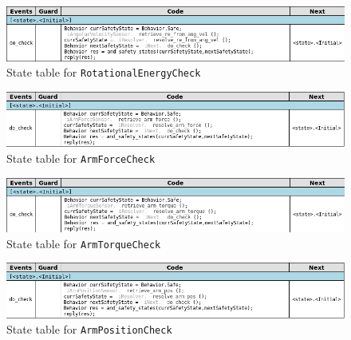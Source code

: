 \documentclass[12pt]{scrreprt}
\begin{document}
\begin{appendices}
\begin{figure}[H]
    \centering
    \includegraphics[width=\textwidth]{Figures/results/modelling_figures/RotationalEnergyCheck/RotationalEnergyCheck_state_table.png}
    \caption{State table for \texttt{RotationalEnergyCheck}}
    \label{fig:RotationalEnergyCheck_state_table}
\end{figure}

\begin{figure}[H]
    \centering
    \includegraphics[width=\textwidth]{Figures/results/modelling_figures/ArmForceCheck/ArmForceCheck_state_table.png}
    \caption{State table for \texttt{ArmForceCheck}}
    \label{fig:ArmForceCheck_state_table}
\end{figure}

\begin{figure}[H]
    \centering
    \includegraphics[width=\textwidth]{Figures/results/modelling_figures/ArmTorqueCheck/ArmTorqueCheck_state_table.png}
    \caption{State table for \texttt{ArmTorqueCheck}}
    \label{fig:ArmTorqueCheck_state_table}
\end{figure}

\begin{figure}[H]
    \centering
    \includegraphics[width=\textwidth]{Figures/results/modelling_figures/ArmPositionCheck/ArmPositionCheck_state_table.png}
    \caption{State table for \texttt{ArmPositionCheck}}
    \label{fig:ArmPositionCheck_state_table}
\end{figure}


\end{appendices}
\end{document}
